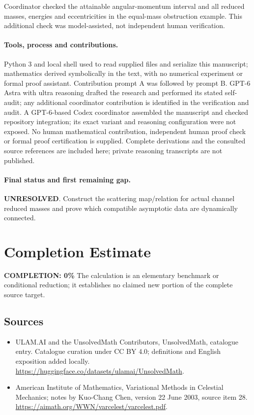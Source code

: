 \documentclass[11pt]{article}
\begin{document}
Coordinator checked the attainable angular-momentum interval and all reduced masses, energies and eccentricities in the equal-mass obstruction example. This additional check was model-assisted, not independent human verification.

\paragraph{Tools, process and contributions.}
Python 3 and local shell used to read supplied files and serialize this manuscript; mathematics derived symbolically in the text, with no numerical experiment or formal proof assistant. Contribution prompt A was followed by prompt B. GPT-6 Astra with ultra reasoning drafted the research and performed its stated self-audit; any additional coordinator contribution is identified in the verification and audit. A GPT-6-based Codex coordinator assembled the manuscript and checked repository integration; its exact variant and reasoning configuration were not exposed. No human mathematical contribution, independent human proof check or formal proof certification is supplied. Complete derivations and the consulted source references are included here; private reasoning transcripts are not published.

\paragraph{Final status and first remaining gap.}
\textbf{UNRESOLVED}. Construct the scattering map/relation for actual channel reduced masses and prove which compatible asymptotic data are dynamically connected.

\section{Completion Estimate}
\noindent\textbf{COMPLETION: 0\%}
The calculation is an elementary benchmark or conditional reduction; it establishes no claimed new portion of the complete source target.

\subsection{Sources}
\begin{itemize}
\item[\hypertarget{source:statement:1}{S1}] ULAM.AI and the UnsolvedMath Contributors, UnsolvedMath, catalogue entry. Catalogue curation under CC BY 4.0; definitions and English exposition added locally.
\url{https://huggingface.co/datasets/ulamai/UnsolvedMath}.
\item[\hypertarget{source:statement:2}{S2}] American Institute of Mathematics, Variational Methods in Celestial Mechanics; notes by Kuo-Chang Chen, version 22 June 2003, source item 28.
\url{https://aimath.org/WWN/varcelest/varcelest.pdf}.
\end{itemize}
\label{end:statement}
\end{document}

